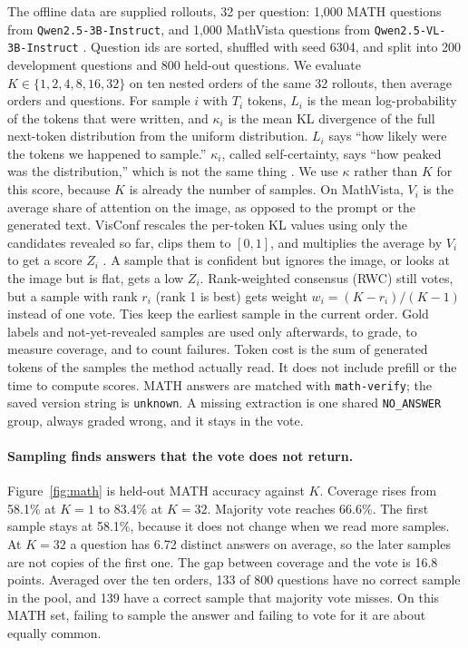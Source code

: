 \documentclass[10pt]{article}
\begin{document}
The offline data are supplied rollouts, 32 per question: 1{,}000 MATH questions from \texttt{Qwen2.5-3B-Instruct}, and 1{,}000 MathVista questions from \texttt{Qwen2.5-VL-3B-Instruct} \cite{hendrycks2021math,lu2024mathvista}.
Question ids are sorted, shuffled with seed 6304, and split into 200 development questions and 800 held-out questions.
We evaluate $K\in\{1,2,4,8,16,32\}$ on ten nested orders of the same 32 rollouts, then average orders and questions.
For sample $i$ with $T_i$ tokens, $L_i$ is the mean log-probability of the tokens that were written, and $\kappa_i$ is the mean KL divergence of the full next-token distribution from the uniform distribution.
$L_i$ says ``how likely were the tokens we happened to sample.''
$\kappa_i$, called self-certainty, says ``how peaked was the distribution,'' which is not the same thing \cite{kang2025selfcertainty}.
We use $\kappa$ rather than $K$ for this score, because $K$ is already the number of samples.
On MathVista, $V_i$ is the average share of attention on the image, as opposed to the prompt or the generated text.
VisConf rescales the per-token KL values using only the candidates revealed so far, clips them to $[0,1]$, and multiplies the average by $V_i$ to get a score $Z_i$ \cite{usman2026visconf}.
A sample that is confident but ignores the image, or looks at the image but is flat, gets a low $Z_i$.
Rank-weighted consensus (RWC) still votes, but a sample with rank $r_i$ (rank 1 is best) gets weight $w_i=(K-r_i)/(K-1)$ instead of one vote.
Ties keep the earliest sample in the current order.
Gold labels and not-yet-revealed samples are used only afterwards, to grade, to measure coverage, and to count failures.
Token cost is the sum of generated tokens of the samples the method actually read.
It does not include prefill or the time to compute scores.
MATH answers are matched with \texttt{math-verify}; the saved version string is \texttt{unknown}.
A missing extraction is one shared \texttt{NO\_ANSWER} group, always graded wrong, and it stays in the vote.

\paragraph{Sampling finds answers that the vote does not return.}
Figure~\ref{fig:math} is held-out MATH accuracy against $K$.
Coverage rises from 58.1\% at $K=1$ to 83.4\% at $K=32$.
Majority vote reaches 66.6\%.
The first sample stays at 58.1\%, because it does not change when we read more samples.
At $K=32$ a question has 6.72 distinct answers on average, so the later samples are not copies of the first one.
The gap between coverage and the vote is 16.8 points.
Averaged over the ten orders, 133 of 800 questions have no correct sample in the pool, and 139 have a correct sample that majority vote misses.
On this MATH set, failing to sample the answer and failing to vote for it are about equally common.
\end{document}
